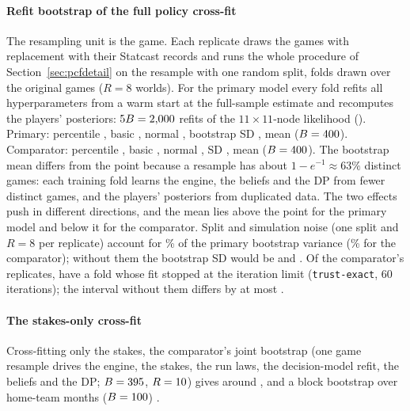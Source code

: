 \documentclass[aoas]{imsart}
\theoremstyle{plain}
\theoremstyle{definition}
\begin{document}
\paragraph{Refit bootstrap of the full policy cross-fit} The resampling unit is the game. Each replicate draws the
\NGamesABS{} games with replacement with their Statcast records and runs the whole procedure of
Section~\ref{sec:pcfdetail} on the resample with one random split, folds drawn over the original games ($R=8$ worlds).
For the primary model every fold refits all \PK{} hyperparameters from a warm start at the full-sample estimate and
recomputes the players' posteriors: $5B=2{,}000$ refits of the $11\times11$-node likelihood (\GapBFailText). Primary: percentile \GapPct, basic \GapBasic, normal \GapNormal, bootstrap SD \GapBootSD, mean
\GapBootMean{} ($B=400$). Comparator: percentile \GapMainPct, basic \GapMainBasic, normal \GapMainNormal{}, SD \GapMainBootSD, mean
\GapMainBootMean{} ($B=400$). The bootstrap mean differs from the point because a resample has about
$1-e^{-1}\approx63\%$ distinct games: each training fold learns the engine, the beliefs and the DP from fewer distinct
games, and the players' posteriors from duplicated data. The two effects push in different directions, and the mean
lies above the point for the primary model and below it for the comparator. Split and simulation noise (one split and
$R=8$ per replicate) account for \GapAlgPct\% of the primary bootstrap variance (\GapMainAlgPct\% for the comparator);
without them the bootstrap SD would be \GapBootSDAlg{} and \GapMainBootSDAlg. Of the comparator's replicates,
\GapMainBFail{} have a fold whose fit stopped at the iteration limit (\texttt{trust-exact}, 60 iterations); the
interval without them differs by at most \GapMainBFailDiff.

\paragraph{The stakes-only cross-fit} Cross-fitting only the stakes, the comparator's joint bootstrap (one game resample drives
the engine, the stakes, the run laws, the decision-model refit, the beliefs and the DP; $B=395$, $R=10$)
gives \JointBootCI{} around \WinsLost, and a block bootstrap over home-team months ($B=100$) \BlockBootCI.
\end{document}
